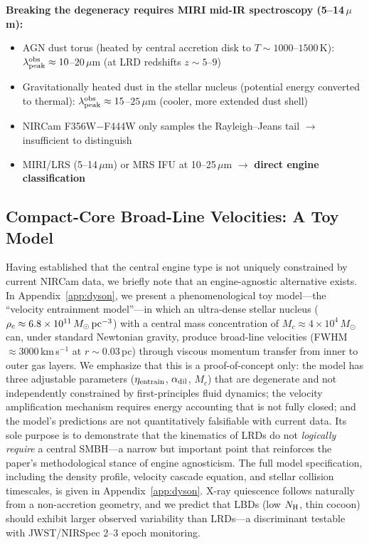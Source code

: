 \documentclass[twocolumn,linenumbers]{aastex631}
\begin{document}
\textbf{Breaking the degeneracy requires MIRI mid-IR spectroscopy (5--14\,$\mu$m):}
\begin{itemize}
\item AGN dust torus (heated by central accretion disk to $T \sim 1000$--$1500$\,K): $\lambda_{\rm peak}^{\rm obs} \approx 10$--$20\,\mu$m (at LRD redshifts $z \sim 5$--$9$)
\item Gravitationally heated dust in the stellar nucleus (potential energy converted to thermal): $\lambda_{\rm peak}^{\rm obs} \approx 15$--$25\,\mu$m (cooler, more extended dust shell)
\item NIRCam F356W$-$F444W only samples the Rayleigh--Jeans tail $\rightarrow$ insufficient to distinguish
\item MIRI/LRS (5--14\,$\mu$m) or MRS IFU at 10--25\,$\mu$m $\rightarrow$ \textbf{direct engine classification}
\end{itemize}

\subsection{Compact-Core Broad-Line Velocities: A Toy Model}

Having established that the central engine type is not uniquely constrained by current NIRCam data, we briefly note that an engine-agnostic alternative exists. In Appendix~\ref{app:dyson}, we present a phenomenological toy model---the ``velocity entrainment model''---in which an ultra-dense stellar nucleus ($\rho_c \approx 6.8 \times 10^{11}\,M_\odot\,{\rm pc}^{-3}$) with a central mass concentration of $M_c \approx 4 \times 10^4\,M_\odot$ can, under standard Newtonian gravity, produce broad-line velocities (FWHM $\approx 3000$\,km\,s$^{-1}$ at $r \sim 0.03$\,pc) through viscous momentum transfer from inner to outer gas layers. We emphasize that this is a proof-of-concept only: the model has three adjustable parameters ($\eta_{\rm entrain}$, $\alpha_{\rm dil}$, $M_c$) that are degenerate and not independently constrained by first-principles fluid dynamics; the velocity amplification mechanism requires energy accounting that is not fully closed; and the model's predictions are not quantitatively falsifiable with current data. Its sole purpose is to demonstrate that the kinematics of LRDs do not \textit{logically require} a central SMBH---a narrow but important point that reinforces the paper's methodological stance of engine agnosticism. The full model specification, including the density profile, velocity cascade equation, and stellar collision timescales, is given in Appendix~\ref{app:dyson}. X-ray quiescence follows naturally from a non-accretion geometry, and we predict that LBDs (low $N_{\rm H}$, thin cocoon) should exhibit larger observed variability than LRDs---a discriminant testable with JWST/NIRSpec 2--3 epoch monitoring.
\end{document}
